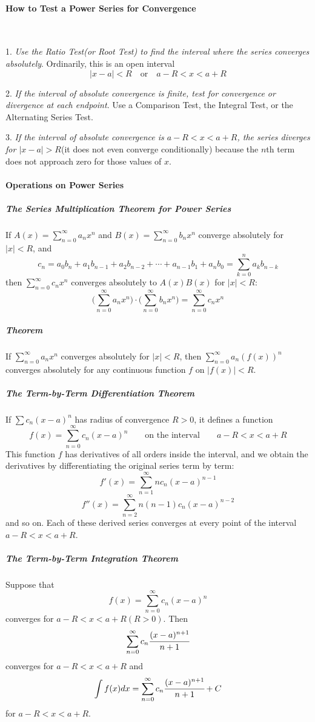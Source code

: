 \documentclass{article}
\begin{document}
            \paragraph{How to Test a Power Series for Convergence}
            \text{}\\
            \par 1. \textit{Use the Ratio Test(or Root Test) to find the interval where the series converges absolutely}. Ordinarily, this is an open interval
            \[|x-a|<R\quad \text{or}\quad a-R<x<a+R\]
            \par 2. \textit{If the interval of absolute convergence is finite, test for convergence or divergence at each endpoint}. Use a Comparison Test, the Integral Test, or the Alternating Series Test.
            \par 3. \textit{If the interval of absolute convergence is $a-R<x<a+R$, the series diverges for $|x-a|>R$}(it does not even converge conditionally) because the $n$th term does not approach zero for those values of $x$.
            \paragraph{Operations on Power Series}
                \subparagraph{The Series Multiplication Theorem for Power Series} If $A(x)=\sum_{n=0}^\infty a_nx^n$ and $B(x)=\sum_{n=0}^\infty b_nx^n$ converge absolutely for $|x|<R$, and 
                \[c_n=a_0b_n+a_1b_{n-1}+a_2b_{n-2}+\cdots+a_{n-1}b_1+a_nb_0=\sum_{k=0}^na_kb_{n-k}\]
                then $\sum_{n=0}^\infty c_n x^n$ converges absolutely to $A(x)B(x)$ for $|x|<R$:
                \[\Bigg(\sum_{n=0}^\infty a_n x^n\Bigg)\cdot\Bigg(\sum_{n=0}^\infty b_n x^n\Bigg)=\sum_{n=0}^\infty c_nx^n\]
                \subparagraph{Theorem} If $\sum_{n=0}^\infty a_nx^n$ converges absolutely for $|x|<R$, then $\sum_{n=0}^\infty a_n(f(x))^n$ converges absolutely for any continuous function $f$ on $|f(x)|<R$.
                \subparagraph{The Term-by-Term Differentiation Theorem} If $\sum c_n(x-a)^n$ has radius of convergence $R>0$, it defines a function
                \[f(x)=\sum_{n=0}^\infty c_n(x-a)^n\qquad \text{on the interval}\qquad a-R<x<a+R\]
                This function $f$ has derivatives of all orders inside the interval, and we obtain the derivatives by differentiating the original series term by term:
                \[f'(x)=\sum_{n=1}^\infty nc_n(x-a)^{n-1}\]
                \[f''(x)=\sum_{n=2}^\infty n(n-1)c_n(x-a)^{n-2}\]
                and so on. Each of these derived series converges at every point of the interval $a-R<x<a+R$.
                \subparagraph{The Term-by-Term Integration Theorem} Suppose that
                \[f(x)=\sum_{n=0}^\infty c_n(x-a)^n\]
                converges for $a-R<x<a+R(R>0)$. Then
                \[\sum_{n=0}^\infty c_n\cfrac{(x-a)^{n+1}}{n+1}\]
                converges for $a-R<x<a+R$ and
                \[\int f(x)dx=\sum_{n=0}^\infty c_n \cfrac{(x-a)^{n+1}}{n+1}+C\]
                for $a-R<x<a+R$.
\end{document}

